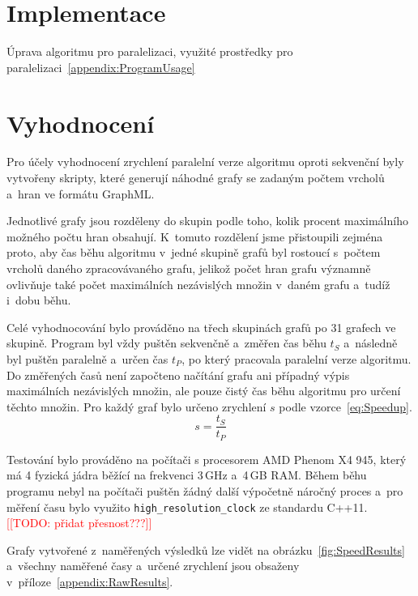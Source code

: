\documentclass[12pt]{article}
\newcommand{\todo}[1]{\textcolor{red}{[[TODO: #1]]}}
\begin{document}
\section{Implementace}
Úprava algoritmu pro paralelizaci, využité prostředky pro paralelizaci~\ref{appendix:ProgramUsage}


\section{Vyhodnocení}
Pro účely vyhodnocení zrychlení paralelní verze algoritmu oproti sekvenční byly vytvořeny skripty, které generují náhodné grafy se zadaným počtem vrcholů a~hran ve formátu GraphML. 

Jednotlivé grafy jsou rozděleny do skupin podle toho, kolik procent maximálního možného počtu hran obsahují. K~tomuto rozdělení jsme přistoupili zejména proto, aby čas běhu algoritmu v~jedné skupině grafů byl rostoucí s~počtem vrcholů daného zpracovávaného grafu, jelikož počet hran grafu významně ovlivňuje také počet maximálních nezávislých množin v~daném grafu a~tudíž i~dobu běhu. 

Celé vyhodnocování bylo prováděno na třech skupinách grafů po 31 grafech ve skupině. Program byl vždy puštěn sekvenčně a~změřen čas běhu $t_S$ a~následně byl puštěn paralelně a~určen čas $t_P$, po který pracovala paralelní verze algoritmu. Do změřených časů není započteno načítání grafu ani případný výpis maximálních nezávislých množin, ale pouze čistý čas běhu algoritmu pro určení těchto množin. Pro každý graf bylo určeno zrychlení $s$ podle vzorce~\ref{eq:Speedup}.
\begin{equation}
    s = \frac{t_S}{t_P} \label{eq:Speedup}
\end{equation}

Testování bylo prováděno na počítači s procesorem AMD Phenom X4 945, který má 4 fyzická jádra běžící na frekvenci 3\,GHz a~4\,GB RAM. Během běhu programu nebyl na počítači puštěn žádný další výpočetně náročný proces a~pro měření času bylo využito \texttt{high\_resolution\_clock} ze standardu C++11. \todo{přidat přesnost???}

Grafy vytvořené z~naměřených výsledků lze vidět na obrázku~\ref{fig:SpeedResults} a~všechny naměřené časy a~určené zrychlení jsou obsaženy v~příloze~\ref{appendix:RawResults}.
\end{document}
